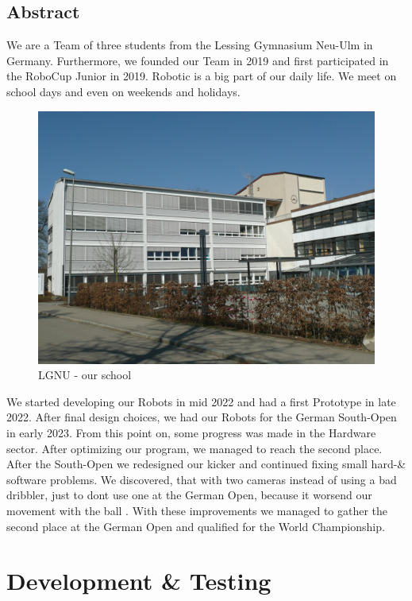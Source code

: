 \documentclass{scrartcl}
\begin{document}
\subsection{Abstract}
We are a Team of three students from the Lessing Gymnasium Neu-Ulm in Germany. Furthermore, we founded our Team
in 2019 and first participated in the RoboCup Junior in 2019. Robotic is a big part of our daily life.
We meet on school days and even on weekends and holidays.
\begin{figure}[h]
    \centering
    \includegraphics[width=\textwidth]{img/lgnu.png}
    \caption{LGNU - our school}
    \label{fig:lgnu}
\end{figure}
\newline
\newline
We started developing our Robots in mid 2022 and had a first Prototype in late 2022. After final design
choices, we had our Robots for the German South-Open in early 2023. From this point on, some progress was
made in the Hardware sector.
After optimizing our program, we managed to reach the second place.
\newline
After the South-Open we redesigned our kicker and continued fixing small hard-\& software problems. We discovered, that with two cameras
instead of using a bad dribbler, just to dont use one at the German Open, because it worsend our movement with the ball .
With these improvements we managed to gather the second place at the German Open and qualified for the World Championship.

\section{Development \& Testing}
\end{document}
